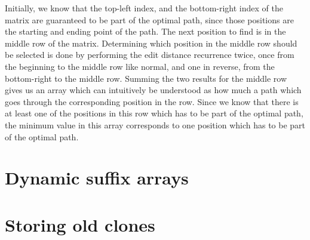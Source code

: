 Initially, we know that the top-left index, and the bottom-right index of the matrix are
guaranteed to be part of the optimal path, since those positions are the starting and
ending point of the path. The next position to find is in the middle row of the matrix.
Determining which position in the middle row should be selected is done by performing the
edit distance recurrence twice, once from the beginning to the middle row like normal, and
one in reverse, from the bottom-right to the middle row. Summing the two results for the
middle row gives us an array which can intuitively be understood as how much a path which
goes through the corresponding position in the row. Since we know that there is at least
one of the positions in this row which has to be part of the optimal path, the minimum
value in this array corresponds to one position which has to be part of the optimal path.

\section{Dynamic suffix arrays}

\section{Storing old clones}
